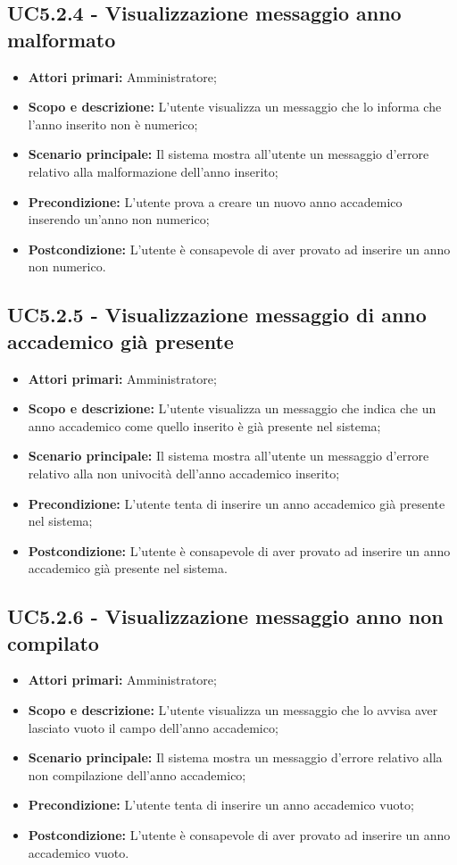 \documentclass[AnalisiDeiRequisiti.tex]{subfiles}
\begin{document}
\subsection{UC5.2.4 - Visualizzazione messaggio anno malformato}
\begin{itemize}
	\item \textbf{Attori primari:} Amministratore;
	\item \textbf{Scopo e descrizione:} L'utente visualizza un messaggio che lo informa che l'anno inserito non è numerico;
	\item \textbf{Scenario principale:} Il sistema mostra all'utente un messaggio d'errore relativo alla malformazione dell'anno inserito;
	\item \textbf{Precondizione:} L'utente prova a creare un nuovo anno accademico inserendo un'anno non numerico; 
	\item \textbf{Postcondizione:} L'utente è consapevole di aver provato ad inserire un anno non numerico.
\end{itemize}
\subsection{UC5.2.5 - Visualizzazione messaggio di anno accademico già presente}
\begin{itemize}
	\item \textbf{Attori primari:} Amministratore;
	\item \textbf{Scopo e descrizione:} L'utente visualizza un messaggio che indica che un anno accademico come quello inserito è già presente nel sistema;
	\item \textbf{Scenario principale:} Il sistema mostra all'utente un messaggio d'errore relativo alla non univocità dell'anno accademico inserito;
	\item \textbf{Precondizione:} L'utente tenta di inserire un anno accademico già presente nel sistema; 
	\item \textbf{Postcondizione:} L'utente è consapevole di aver provato ad inserire un anno accademico già presente nel sistema.
\end{itemize}
\subsection{UC5.2.6 - Visualizzazione messaggio anno non compilato}
\begin{itemize}
	\item \textbf{Attori primari:} Amministratore;
	\item \textbf{Scopo e descrizione:} L'utente visualizza un messaggio che lo avvisa aver lasciato vuoto il campo dell'anno accademico;
	\item \textbf{Scenario principale:} Il sistema mostra un messaggio d'errore relativo alla non compilazione dell'anno accademico;
	\item \textbf{Precondizione:} L'utente tenta di inserire un anno accademico vuoto; 
	\item \textbf{Postcondizione:} L'utente è consapevole di aver provato ad inserire un anno accademico vuoto.
\end{itemize}
\end{document}
